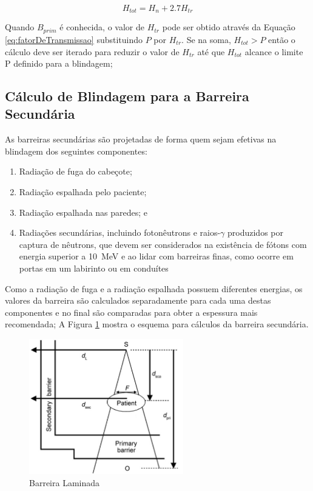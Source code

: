 \documentclass[11pt,a4paper]{article}
\begin{document}
            \begin{equation}
                H_{tot} = H_n + 2.7 H_{tr}
            \end{equation}

            Quando $B_{prim}$ é conhecida, o valor de $H_{tr}$ pode ser obtido através da Equação \ref{eq:fatorDeTransmissao} substituindo $P$ por $H_{tr}$. Se na soma,  $H_{tot} > P$ então o cálculo deve ser iterado para reduzir o valor de $H_{tr}$ até que $H_{tot}$ alcance o limite P definido para a blindagem;

        \subsection{Cálculo de Blindagem para a Barreira Secundária}

            As barreiras secundárias são projetadas de forma quem sejam efetivas na blindagem dos seguintes componentes:

                \begin{enumerate}
                    \item Radiação de fuga do cabeçote;
                    \item Radiação espalhada pelo paciente;
                    \item Radiação espalhada nas paredes; e 
                    \item Radiações secundárias, incluindo fotonêutrons e raios-$\gamma$ produzidos por captura de nêutrons, que devem ser considerados na existência de fótons com energia superior a \qty{10}{MeV} e ao lidar com barreiras finas, como ocorre em portas em um labirinto ou em conduítes 
                \end{enumerate}

            Como a radiação de fuga e a radiação espalhada possuem diferentes energias, os valores da barreira são calculados separadamente para cada uma destas componentes e no final são comparadas para obter a espessura mais recomendada; A Figura \ref{fig:esquemaTransmissaoRadiacaoEspalhadaPaciente} mostra o esquema para cálculos da barreira secundária. 

            \begin{figure}[h]
                \centering
                \includegraphics[width=0.6\textwidth]{Imagens/esquemaTransmissaoRadiacaoEspalhadaPaciente.JPG}
                \caption{Barreira Laminada}
                \label{fig:esquemaTransmissaoRadiacaoEspalhadaPaciente}
            \end{figure}
\end{document}
